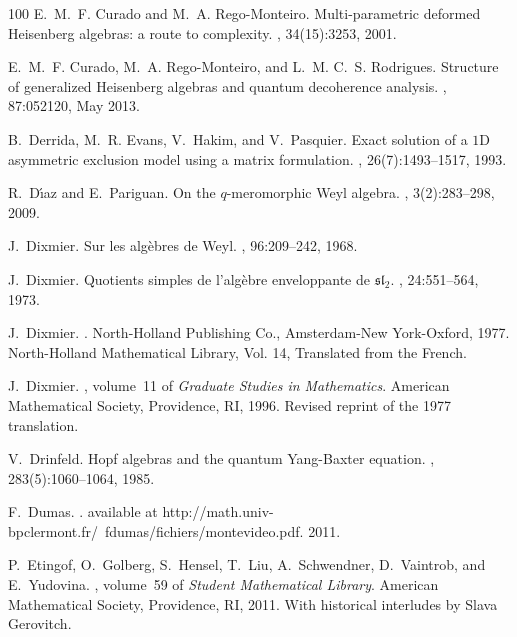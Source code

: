 \documentclass{commat}
\begin{document}
\begin{thebibliography}{100}
E.~M.~F. Curado and M.~A. Rego-Monteiro.
\newblock Multi-parametric deformed {H}eisenberg algebras: a route to
  complexity.
, 34(15):3253,
  2001.

E.~M.~F. Curado, M.~A. Rego-Monteiro, and L.~M. C.~S. Rodrigues.
\newblock Structure of generalized {H}eisenberg algebras and quantum
  decoherence analysis.
, 87:052120, May 2013.

B.~Derrida, M.~R. Evans, V.~Hakim, and V.~Pasquier.
\newblock Exact solution of a {$1$}{D} asymmetric exclusion model using a
  matrix formulation.
, 26(7):1493--1517, 1993.

R.~D\'{\i}az and E.~Pariguan.
\newblock On the {$q$}-meromorphic {W}eyl algebra.
, 3(2):283--298, 2009.

J.~Dixmier.
\newblock Sur les alg\`ebres de {W}eyl.
, 96:209--242, 1968.

J.~Dixmier.
\newblock Quotients simples de l'alg\`ebre enveloppante de {${\mathfrak
  s}{\mathfrak l}_{2}$}.
, 24:551--564, 1973.

J.~Dixmier.
.
\newblock North-Holland Publishing Co., Amsterdam-New York-Oxford, 1977.
\newblock North-Holland Mathematical Library, Vol. 14, Translated from the
  French.

J.~Dixmier.
, volume~11 of {\em Graduate Studies in
  Mathematics}.
\newblock American Mathematical Society, Providence, RI, 1996.
\newblock Revised reprint of the 1977 translation.

V.~Drinfel{\cprime}d.
\newblock Hopf algebras and the quantum {Y}ang-{B}axter equation.
, 283(5):1060--1064, 1985.

F.~Dumas.
.
\newblock available at
  http://math.univ-bpclermont.fr/~fdumas/fichiers/montevideo.pdf. 2011.

P.~Etingof, O.~Golberg, S.~Hensel, T.~Liu, A.~Schwendner, D.~Vaintrob, and
  E.~Yudovina.
, volume~59 of {\em
  Student Mathematical Library}.
\newblock American Mathematical Society, Providence, RI, 2011.
\newblock With historical interludes by Slava Gerovitch.


\end{thebibliography}
\end{document}
